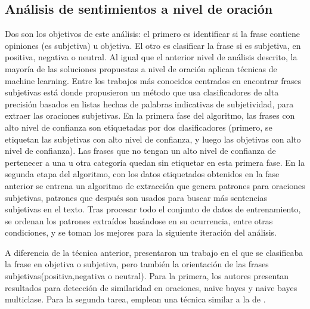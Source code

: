 \subsection{Análisis de sentimientos a nivel de oración}
Dos son los objetivos de este análisis: el primero es identificar si la frase contiene opiniones (es subjetiva) u objetiva. El otro es clasificar la frase si es subjetiva, en positiva, negativa o neutral.   
Al igual que el anterior nivel de análisis descrito, la mayoría de las soluciones propuestas a nivel de oración aplican técnicas de machine learning. \newline
Entre los trabajos más conocidos centrados en encontrar frases subjetivas está\citet{riloff2003learning} donde propusieron un método que usa clasificadores de alta precisión basados en listas hechas de palabras indicativas de subjetividad, para extraer las oraciones subjetivas. En la primera fase del algoritmo, las frases con alto nivel de confianza son etiquetadas por dos clasificadores (primero, se etiquetan las subjetivas con alto nivel de confianza, y luego las objetivas con alto nivel de confianza). Las frases que no tengan un alto nivel de confianza de pertenecer a una u otra categoría quedan sin etiquetar en esta primera fase. \newline
En la segunda etapa del algoritmo, con los datos etiquetados obtenidos en la fase anterior se entrena un algoritmo de extracción que genera patrones para oraciones subjetivas, patrones que después son usados para buscar más sentencias subjetivas en el texto. Tras procesar todo el conjunto de datos de entrenamiento, se ordenan los patrones extraídos basándose en su ocurrencia, entre otras condiciones, y se toman los mejores para la siguiente iteración del análisis. \newline

A diferencia de la técnica anterior, \citet{yu2003towards} presentaron un trabajo en el que se clasificaba la frase en objetiva o subjetiva, pero también la orientación de las frases subjetivas(positiva,negativa o neutral). Para la primera, los autores presentan resultados para  \textsf{detección de similaridad en oraciones}, \textsf{naive bayes} y \textsf{naive bayes multiclase}. Para la segunda tarea, emplean una técnica similar a la de \citet{turney2002thumbs}.  
